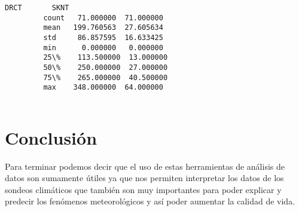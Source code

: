 \documentclass[12pt]{article}
\begin{document}
\begin{enumerate}
\begin{Verbatim}[commandchars=\\\{\}]
                      DRCT       SKNT  
         count   71.000000  71.000000  
         mean   199.760563  27.605634  
         std     86.857595  16.633425  
         min      0.000000   0.000000  
         25\%    113.500000  13.000000  
         50\%    250.000000  27.000000  
         75\%    265.000000  40.500000  
         max    348.000000  64.000000  
         
\end{Verbatim}
\end{enumerate}
	\section{Conclusión}
    Para terminar podemos decir que el uso de estas herramientas de análisis de datos son sumamente útiles ya que nos permiten interpretar los datos de los sondeos climáticos que también son muy importantes para poder explicar y predecir los fenómenos meteorológicos y así poder aumentar la calidad de vida.
    
    
   
\end{document}
